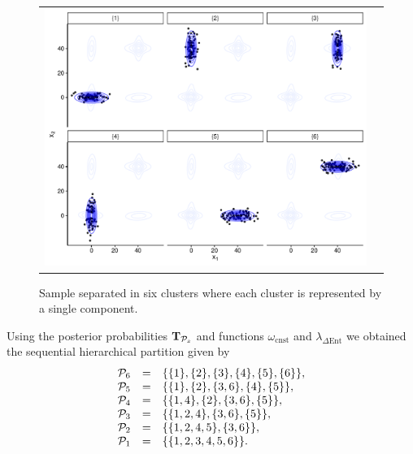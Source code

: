 \documentclass[submit]{smj}
\theoremstyle{definition}
\begin{document}
\begin{figure}[h]
\begin{center}
\begin{tabular}{cc}
  \includegraphics[width=\textwidth]{figures/partition-example-part6.pdf} \\
 \end{tabular}
 \caption{Sample separated in six clusters where each cluster is represented by a single component.}\label{ex_one_one}
\end{center}
\end{figure}

Using the posterior probabilities $\text{\textbf{T}}_{\mathcal{P}_s}$ and functions $\omega_{\text{cnst}}$ and $\lambda_{\Delta\text{Ent}}$ we obtained the sequential hierarchical partition given by 
\begin{equation}
\begin{array}{r c l}
\mathcal{P}_6 &=& \{\{1\},\{2\},\{3\},\{4\},\{5\},\{6\}\},\\
\mathcal{P}_5 &=& \{\{1\},\{2\}, \{3, 6\},\{4\},\{5\} \},\\
\mathcal{P}_4 &=& \{\{1, 4\},\{2\}, \{3, 6\}, \{5\} \}, \\
\mathcal{P}_3 &=& \{\{1, 2, 4\}, \{3, 6\}, \{5\} \}, \\
\mathcal{P}_2 &=& \{\{1, 2 , 4, 5\}, \{3, 6\} \},  \\
\mathcal{P}_1 &=& \{\{1, 2, 3, 4, 5, 6\}\}.
\end{array}
\label{hier_ex}
\end{equation}
\end{document}

